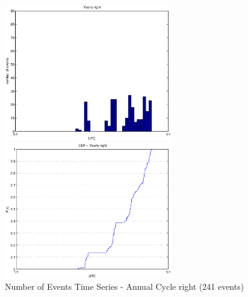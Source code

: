 \documentclass[a4paper,11pt]{article}
\begin{document}
\begin{figure}[htbp]
\begin{minipage}{0.55\hsize}
\centering
\includegraphics[width=7.3cm, clip]{histTimeYearlyR.eps}
\end{minipage}
\begin{minipage}{0.55\hsize}
 \centering
\includegraphics[width=7.3cm, clip]{CDFTimeYearlyR.eps}
\end{minipage}
\caption{Number of Events Time Series - Annual Cycle right (241 events)}
\end{figure}
\end{document}
